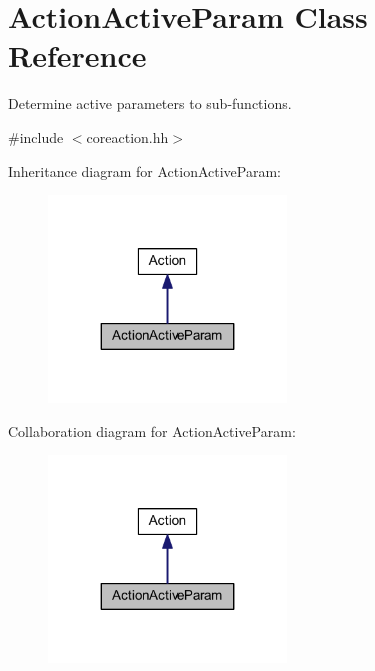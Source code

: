 \hypertarget{class_action_active_param}{}\section{Action\+Active\+Param Class Reference}
\label{class_action_active_param}


Determine active parameters to sub-\/functions.  




{\ttfamily \#include $<$coreaction.\+hh$>$}



Inheritance diagram for Action\+Active\+Param\+:
\nopagebreak
\begin{figure}[H]
\begin{center}
\leavevmode
\includegraphics[width=179pt]{class_action_active_param__inherit__graph}
\end{center}
\end{figure}


Collaboration diagram for Action\+Active\+Param\+:
\nopagebreak
\begin{figure}[H]
\begin{center}
\leavevmode
\includegraphics[width=179pt]{class_action_active_param__coll__graph}
\end{center}
\end{figure}
